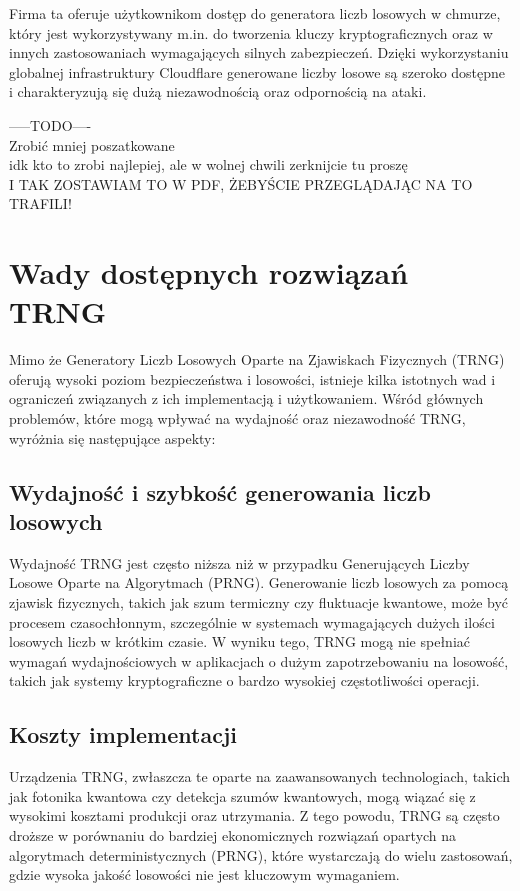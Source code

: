 Firma ta oferuje użytkownikom dostęp do generatora liczb losowych w chmurze, który jest wykorzystywany
m.in. do tworzenia kluczy kryptograficznych oraz w innych zastosowaniach wymagających silnych zabezpieczeń.
Dzięki wykorzystaniu globalnej infrastruktury Cloudflare generowane liczby losowe są
szeroko dostępne i charakteryzują się dużą niezawodnością oraz odpornością na ataki.


        -----TODO---- \\
    Zrobić mniej poszatkowane \\
    idk kto to zrobi najlepiej, ale w wolnej chwili zerknijcie tu proszę \\
    I TAK ZOSTAWIAM TO W PDF, ŻEBYŚCIE PRZEGLĄDAJĄC NA TO TRAFILI! \\


\section{Wady dostępnych rozwiązań TRNG}

Mimo że Generatory Liczb Losowych Oparte na Zjawiskach Fizycznych (TRNG) oferują wysoki poziom bezpieczeństwa i losowości, istnieje kilka istotnych wad i ograniczeń związanych z ich implementacją i użytkowaniem. Wśród głównych problemów, które mogą wpływać na wydajność oraz niezawodność TRNG, wyróżnia się następujące aspekty:

\subsection{Wydajność i szybkość generowania liczb losowych}

Wydajność TRNG jest często niższa niż w przypadku Generujących Liczby Losowe Oparte na Algorytmach (PRNG). Generowanie liczb losowych za pomocą zjawisk fizycznych, takich jak szum termiczny czy fluktuacje kwantowe, może być procesem czasochłonnym, szczególnie w systemach wymagających dużych ilości losowych liczb w krótkim czasie. W wyniku tego, TRNG mogą nie spełniać wymagań wydajnościowych w aplikacjach o dużym zapotrzebowaniu na losowość, takich jak systemy kryptograficzne o bardzo wysokiej częstotliwości operacji.

\subsection{Koszty implementacji}

Urządzenia TRNG, zwłaszcza te oparte na zaawansowanych technologiach, takich jak fotonika kwantowa czy detekcja szumów kwantowych, mogą wiązać się z wysokimi kosztami produkcji oraz utrzymania. Z tego powodu, TRNG są często droższe w porównaniu do bardziej ekonomicznych rozwiązań opartych na algorytmach deterministycznych (PRNG), które wystarczają do wielu zastosowań, gdzie wysoka jakość losowości nie jest kluczowym wymaganiem.

